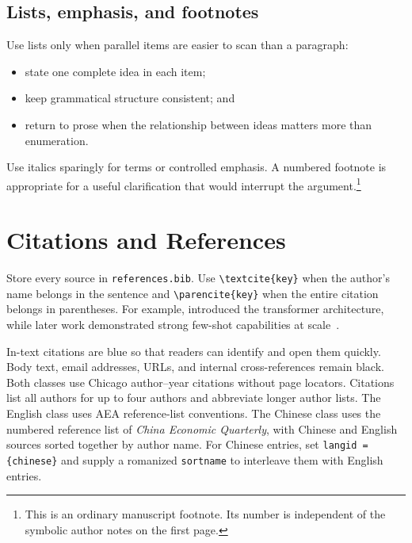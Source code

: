 \documentclass{templates/aidealabs-paper}
\begin{document}
\subsection{Lists, emphasis, and footnotes}

Use lists only when parallel items are easier to scan than a paragraph:

\begin{itemize}
  \item state one complete idea in each item;
  \item keep grammatical structure consistent; and
  \item return to prose when the relationship between ideas matters more than enumeration.
\end{itemize}

Use italics sparingly for terms or controlled emphasis. A numbered footnote is appropriate for a useful clarification that would interrupt the argument.\footnote{This is an ordinary manuscript footnote. Its number is independent of the symbolic author notes on the first page.}


\section{Citations and References}
\label{sec:citations}

Store every source in \texttt{references.bib}. Use \verb|\textcite{key}| when the author's name belongs in the sentence and \verb|\parencite{key}| when the entire citation belongs in parentheses. For example, \textcite{vaswani2017attention} introduced the transformer architecture, while later work demonstrated strong few-shot capabilities at scale~\parencite{brown2020language}.

In-text citations are blue so that readers can identify and open them quickly. Body text, email addresses, URLs, and internal cross-references remain black. Both classes use Chicago author--year citations without page locators.
Citations list all authors for up to four authors and abbreviate longer author lists.
The English class uses AEA reference-list conventions.
The Chinese class uses the numbered reference list of \emph{China Economic Quarterly}, with Chinese and English sources sorted together by author name.
For Chinese entries, set \texttt{langid = \{chinese\}} and supply a romanized \texttt{sortname} to interleave them with English entries.
\end{document}
